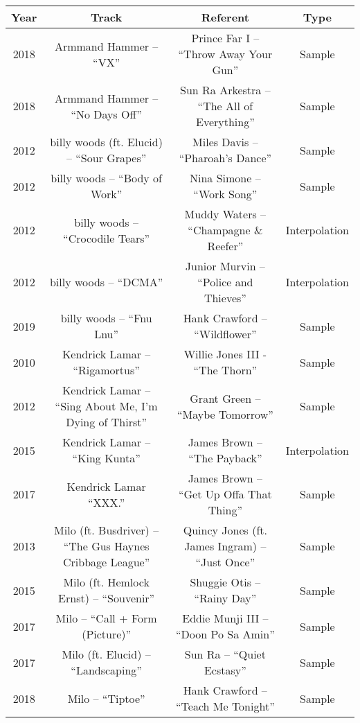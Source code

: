 \begin{sidewaystable}[p]
    \centering
    \small
    \begin{tabular}{|c|c|c|c|}
         \hline
        Year & Track & Referent & Type \\ \hline
        2018 & Armmand Hammer -- ``VX'' & Prince Far I -- ``Throw Away Your Gun'' & Sample \\ \hline
        2018 & Armmand Hammer -- ``No Days Off'' & Sun Ra Arkestra -- ``The All of Everything'' & Sample \\ \hline
        2012 & billy woods (ft. Elucid) -- ``Sour Grapes'' & Miles Davis -- ``Pharoah's Dance'' & Sample \\ \hline
        2012 & billy woods -- ``Body of Work'' & Nina Simone -- ``Work Song'' & Sample \\ \hline
        2012 & billy woods -- ``Crocodile Tears'' & Muddy Waters -- ``Champagne \& Reefer'' & Interpolation \\ \hline
        2012 & billy woods -- ``DCMA'' & Junior Murvin -- ``Police and Thieves'' & Interpolation \\ \hline
        2019 & billy woods -- ``Fnu Lnu'' & Hank Crawford -- ``Wildflower'' & Sample \\ \hline
        2010 & Kendrick Lamar -- ``Rigamortus'' & Willie Jones III - ``The Thorn'' & Sample \\ \hline 
        2012 & Kendrick Lamar -- ``Sing About Me, I'm Dying of Thirst'' & Grant Green -- ``Maybe Tomorrow'' & Sample \\ \hline
        2015 & Kendrick Lamar -- ``King Kunta'' & James Brown -- ``The Payback'' & Interpolation \\ \hline
        2017 & Kendrick Lamar ``XXX.'' & James Brown -- ``Get Up Offa That Thing'' & Sample \\ \hline
        2013 & Milo (ft. Busdriver) -- ``The Gus Haynes Cribbage League'' & Quincy Jones (ft. James Ingram) -- ``Just Once'' & Sample \\ \hline
        2015 & Milo (ft. Hemlock Ernst) -- ``Souvenir'' & Shuggie Otis -- ``Rainy Day'' & Sample \\ \hline
        2017 & Milo -- ``Call + Form (Picture)'' & Eddie Munji III -- ``Doon Po Sa Amin'' & Sample \\ \hline
        2017 & Milo (ft. Elucid) -- ``Landscaping'' & Sun Ra -- ``Quiet Ecstasy'' & Sample \\ \hline
        2018 & Milo -- ``Tiptoe'' & Hank Crawford -- ``Teach Me Tonight'' & Sample \\ \hline

\end{tabular}
\end{sidewaystable}
